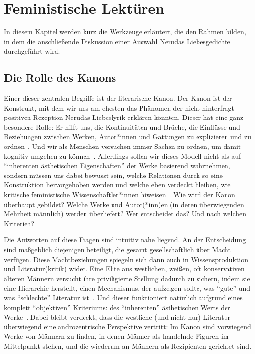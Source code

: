 \section{Feministische Lektüren}

In diesem Kapitel werden kurz die Werkzeuge erläutert, die den Rahmen bilden, in dem die anschließende Diskussion einer Auswahl Nerudas Liebesgedichte durchgeführt wird.

\subsection{Die Rolle des Kanons}
\label{chap:canon}

Einer dieser zentralen Begriffe ist der literarische Kanon.
Der Kanon ist der Konstrukt, mit dem wir uns am ehesten das Phänomen der nicht hinterfragt positiven Rezeption Nerudas Liebeslyrik erklären könnten.
Dieser hat eine ganz besondere Rolle:
Er hilft uns, die Kontinuitäten und Brüche, die Einflüsse und Beziehungen zwischen Werken, Autor*innen und Gattungen zu explizieren und zu ordnen~\cite{Kolodny1980}.
Und wir als Menschen versuchen immer Sachen zu ordnen, um damit kognitiv umgehen zu können~\cite{JorRus1999}.
Allerdings sollen wir dieses Modell nicht als auf ``inherenten ästhetischen Eigenschaften'' der Werke basierend wahrnehmen, sondern müssen uns dabei bewusst sein, welche Relationen durch so eine Konstruktion hervorgehoben werden und welche eben verdeckt bleiben, wie kritische feministische Wissenschaftler*innen hiweisen~\cite{Kolodny1980}.
Wie wird der Kanon überhaupt gebildet?
Welche Werke und Autor(*inn)en (in deren überwiegenden Mehrheit männlich) werden überliefert?
Wer entscheidet das?
Und nach welchen Kriterien?

Die Antworten auf diese Fragen sind intuitiv nahe liegend.
An der Entscheidung sind maßgeblich diejenigen beteiligt, die gesamt gesellschaftlich über Macht verfügen.
Diese Machtbeziehungen spiegeln sich dann auch in Wissensproduktion und Literatur(kritik) wider.
Eine Elite aus westlichen, weißen, oft konservativen älteren Männern versucht ihre priviligierte Stellung dadurch zu sichern, indem sie eine Hierarchie herstellt, einen Mechanismus, der aufzeigen sollte, was ``gute'' und was ``schlechte'' Literatur ist~\cite{North2013}.
Und dieser funktioniert natürlich aufgrund eines komplett ``objektiven'' Kriteriums: des ``inherenten'' ästhetischen Werts der Werke~\cite{Kolodny1980}.
Dabei bleibt verdeckt, dass die westliche (und nicht nur) Literatur überwiegend eine androzentrische Perspektive vertritt:
Im Kanon sind vorwiegend Werke von Männern zu finden, in denen Männer als handelnde Figuren im Mittelpunkt stehen, und die wiederum an Männern als Rezipienten gerichtet sind.

